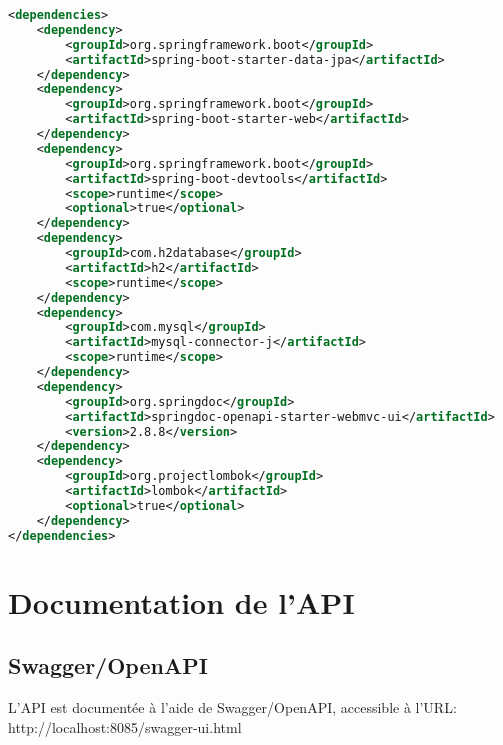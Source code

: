 \documentclass[12pt,a4paper]{report}
\begin{document}
\begin{lstlisting}[language=XML, caption=pom.xml (extrait)]
<dependencies>
    <dependency>
        <groupId>org.springframework.boot</groupId>
        <artifactId>spring-boot-starter-data-jpa</artifactId>
    </dependency>
    <dependency>
        <groupId>org.springframework.boot</groupId>
        <artifactId>spring-boot-starter-web</artifactId>
    </dependency>
    <dependency>
        <groupId>org.springframework.boot</groupId>
        <artifactId>spring-boot-devtools</artifactId>
        <scope>runtime</scope>
        <optional>true</optional>
    </dependency>
    <dependency>
        <groupId>com.h2database</groupId>
        <artifactId>h2</artifactId>
        <scope>runtime</scope>
    </dependency>
    <dependency>
        <groupId>com.mysql</groupId>
        <artifactId>mysql-connector-j</artifactId>
        <scope>runtime</scope>
    </dependency>
    <dependency>
        <groupId>org.springdoc</groupId>
        <artifactId>springdoc-openapi-starter-webmvc-ui</artifactId>
        <version>2.8.8</version>
    </dependency>
    <dependency>
        <groupId>org.projectlombok</groupId>
        <artifactId>lombok</artifactId>
        <optional>true</optional>
    </dependency>
</dependencies>
\end{lstlisting}



\chapter{Documentation de l'API}
\section{Swagger/OpenAPI}
L'API est documentée à l'aide de Swagger/OpenAPI, accessible à l'URL: http://localhost:8085/swagger-ui.html
\end{document}
